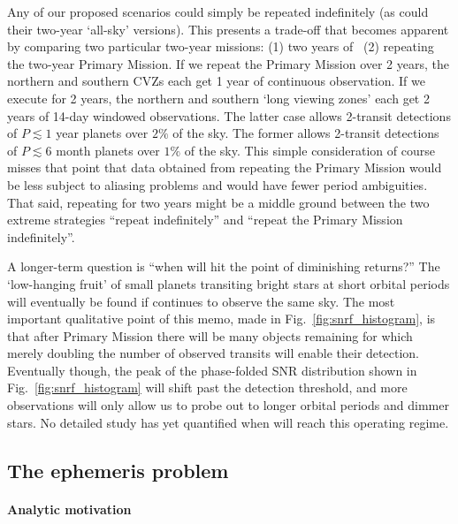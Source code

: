 Any of our proposed scenarios could simply be repeated indefinitely
(as could their two-year `all-sky' versions).  This presents a
trade-off that becomes apparent by comparing two particular two-year
missions: (1) two years of \hemis\, (2) repeating the two-year Primary
Mission.  If we repeat the Primary Mission over 2 years, the northern
and southern CVZs each get 1 year of continuous observation.  If we
execute \hemis\:for 2 years, the northern and southern `long viewing
zones' each get 2 years of 14-day windowed observations.  The latter
case allows 2-transit detections of $P\lesssim1$ year planets over
$2\%$ of the sky.  The former allows 2-transit detections of
$P\lesssim6$ month planets over $1\%$ of the sky.  This simple
consideration of course misses that point that data obtained from
repeating the Primary Mission would be less subject to aliasing
problems and would have fewer period ambiguities.  That said,
repeating \hemis\:for two years might be a middle ground between the
two extreme strategies ``repeat \npole\:indefinitely'' and ``repeat
the Primary Mission indefinitely''.

A longer-term question is ``when will \tess hit the point of
diminishing returns?''  The `low-hanging fruit' of small planets
transiting bright stars at short orbital periods will eventually be
found if \tess continues to observe the same sky.  The most important
qualitative point of this memo, made in Fig.~\ref{fig:snrf_histogram},
is that after \tesss Primary Mission there will be many objects
remaining for which merely doubling the number of observed transits
will enable their detection.  Eventually though, the peak of the
phase-folded SNR distribution shown in Fig.~\ref{fig:snrf_histogram}
will shift past the detection threshold, and more observations will
only allow us to probe out to longer orbital periods and dimmer stars.
No detailed study has yet quantified when \tess will reach this
operating regime.

\subsection{The ephemeris problem}
\label{sec:ephemeris_times}

\paragraph{Analytic motivation}


